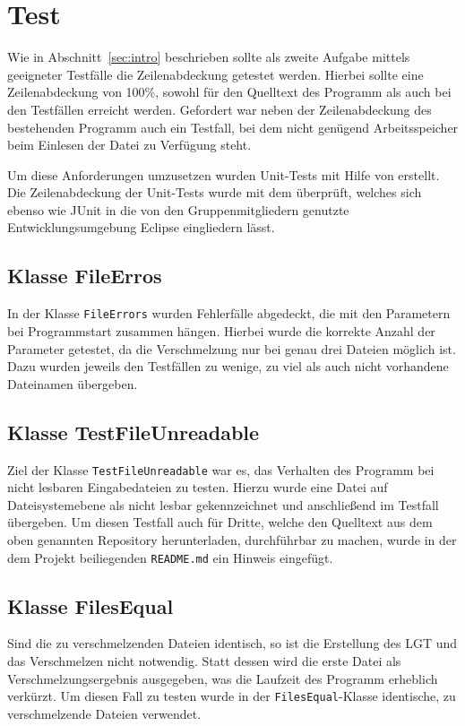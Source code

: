 \documentclass[a4paper,titlepage,12pt]{scrartcl}
\begin{document}
\section{Test}
\label{sec:test}

Wie in Abschnitt~\ref{sec:intro} beschrieben sollte als zweite Aufgabe mittels geeigneter Testfälle die Zeilenabdeckung getestet werden.
Hierbei sollte eine Zeilenabdeckung von 100\%, sowohl für den Quelltext des Programm als auch bei den Testfällen erreicht werden.
Gefordert war neben der Zeilenabdeckung des bestehenden Programm auch ein Testfall, bei dem nicht genügend Arbeitsspeicher beim Einlesen der Datei zu Verfügung steht.

Um diese Anforderungen umzusetzen wurden Unit-Tests mit Hilfe von \citep{www:JUNIT} erstellt. Die Zeilenabdeckung der Unit-Tests wurde mit dem \citep{www:ECLEMMA} überprüft, welches sich ebenso wie JUnit in die von den Gruppenmitgliedern genutzte Entwicklungsumgebung Eclipse eingliedern lässt.

\subsection{Klasse FileErros}
\label{sec:fileerrors}
In der Klasse \texttt{FileErrors} wurden Fehlerfälle abgedeckt, die mit den Parametern bei Programmstart zusammen hängen.
Hierbei wurde die korrekte Anzahl der Parameter getestet, da die Verschmelzung nur bei genau drei Dateien möglich ist.
Dazu wurden jeweils den Testfällen zu wenige, zu viel als auch nicht vorhandene Dateinamen übergeben.

\subsection{Klasse TestFileUnreadable}
\label{sec:fileunreadable}
Ziel der Klasse \texttt{TestFileUnreadable} war es, das Verhalten des Programm bei nicht lesbaren Eingabedateien zu testen.
Hierzu wurde eine Datei auf Dateisystemebene als nicht lesbar gekennzeichnet und anschließend im Testfall übergeben.
Um diesen Testfall auch für Dritte, welche den Quelltext aus dem oben genannten Repository herunterladen, durchführbar zu machen, wurde in der dem Projekt beiliegenden \texttt{README.md} ein Hinweis eingefügt.

\subsection{Klasse FilesEqual}
\label{sec:filesequal}
Sind die zu verschmelzenden Dateien identisch, so ist die Erstellung des LGT und das Verschmelzen nicht notwendig. Statt dessen wird die erste Datei als Verschmelzungsergebnis ausgegeben, was die Laufzeit des Programm erheblich verkürzt. Um diesen Fall zu testen wurde in der \texttt{FilesEqual}-Klasse identische, zu verschmelzende Dateien verwendet.
\end{document}
